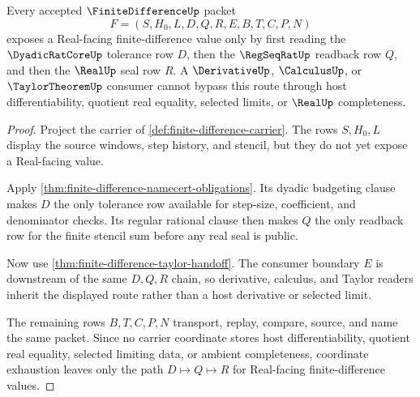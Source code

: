 \begin{theorem}
\label{thm:finite-difference-regular-real-handoff}
Every accepted $\FiniteDifferenceUp$ packet
$$
F=(S,H_0,L,D,Q,R,E,B,T,C,P,N)
$$
exposes a Real-facing finite-difference value only by first reading the $\DyadicRatCoreUp$ tolerance row $D$, then the $\RegSeqRatUp$ readback row $Q$, and then the $\RealUp$ seal row $R$. A $\DerivativeUp$, $\CalculusUp$, or $\TaylorTheoremUp$ consumer cannot bypass this route through host differentiability, quotient real equality, selected limits, or $\RealUp$ completeness.
\end{theorem}
\begin{proof}
Project the carrier of \autoref{def:finite-difference-carrier}. The rows $S,H_0,L$ display the source windows, step history, and stencil, but they do not yet expose a Real-facing value.

Apply \autoref{thm:finite-difference-namecert-obligations}. Its dyadic budgeting clause makes $D$ the only tolerance row available for step-size, coefficient, and denominator checks. Its regular rational clause then makes $Q$ the only readback row for the finite stencil sum before any real seal is public.

Now use \autoref{thm:finite-difference-taylor-handoff}. The consumer boundary $E$ is downstream of the same $D,Q,R$ chain, so derivative, calculus, and Taylor readers inherit the displayed route rather than a host derivative or selected limit.

The remaining rows $B,T,C,P,N$ transport, replay, compare, source, and name the same packet. Since no carrier coordinate stores host differentiability, quotient real equality, selected limiting data, or ambient completeness, coordinate exhaustion leaves only the path $D \longmapsto Q \longmapsto R$ for Real-facing finite-difference values.
\end{proof}



